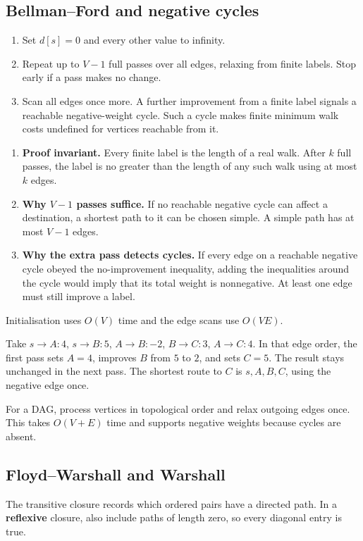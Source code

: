 \documentclass[12pt,a4paper]{article}
\begin{document}
\subsection{Bellman--Ford and negative cycles}
\begin{enumerate}[leftmargin=*, itemsep=3pt, topsep=4pt]
  \item Set $d[s]=0$ and every other value to infinity.
  \item Repeat up to $V-1$ full passes over all edges, relaxing from finite labels. Stop early if a pass makes no change.
  \item Scan all edges once more. A further improvement from a finite label signals a reachable negative-weight cycle. Such a cycle makes finite minimum walk costs undefined for vertices reachable from it.
\end{enumerate}
\begin{enumerate}[leftmargin=*, itemsep=2pt]
  \item { \textbf{Proof invariant.} Every finite label is the length of a real walk. After $k$ full passes, the label is no greater than the length of any such walk using at most $k$ edges.\par}
  \item \textbf{Why $V-1$ passes suffice.} If no reachable negative cycle can affect a destination, a shortest path to it can be chosen simple. A simple path has at most $V-1$ edges.
  \item \textbf{Why the extra pass detects cycles.} If every edge on a reachable negative cycle obeyed the no-improvement inequality, adding the inequalities around the cycle would imply that its total weight is nonnegative. At least one edge must still improve a label.
\end{enumerate}
Initialisation uses $O(V)$ time and the edge scans use $O(VE)$.
\begin{tcolorbox}[examplebox, title={A negative edge that Bellman--Ford handles}]
Take $s\to A:4$, $s\to B:5$, $A\to B:-2$, $B\to C:3$, $A\to C:4$. In that edge order, the first pass sets $A=4$, improves $B$ from $5$ to $2$, and sets $C=5$. The result stays unchanged in the next pass. The shortest route to $C$ is $s,A,B,C$, using the negative edge once.
\end{tcolorbox}

For a DAG, process vertices in topological order and relax outgoing edges once. This takes $O(V+E)$ time and supports negative weights because cycles are absent.

\subsection{Floyd--Warshall and Warshall}
\begin{tcolorbox}[defbox, title={Transitive closure}]
The transitive closure records which ordered pairs have a directed path. In a \textbf{reflexive} closure, also include paths of length zero, so every diagonal entry is true.
\end{tcolorbox}
\end{document}
